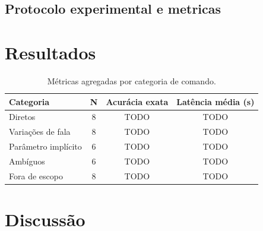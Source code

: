 \documentclass[12pt]{article}
\begin{document}
\subsection{Protocolo experimental e metricas}

\section{Resultados}

\begin{table}[h]
\centering
\caption{Métricas agregadas por categoria de comando.}
\label{tab:metricas}
\begin{tabular}{lccc}
\toprule
Categoria & N & Acurácia exata & Latência média (s) \\
\midrule
Diretos            & 8 & TODO & TODO \\
Variações de fala   & 8 & TODO & TODO \\
Parâmetro implícito & 6 & TODO & TODO \\
Ambíguos            & 6 & TODO & TODO \\
Fora de escopo      & 8 & TODO & TODO \\
\bottomrule
\end{tabular}
\end{table}


\section{Discussão}
\end{document}
